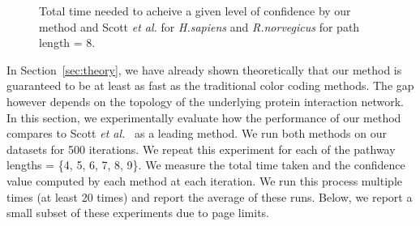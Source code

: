 \documentclass{ws-procs11x85}
\newcommand{\goodgap}{
        \hspace{\subfigtopskip}
        \hspace{\subfigbottomskip}
}
\begin{document}
\begin{figure}[t]
  \centering {}
\goodgap
{}

\caption{Total time needed to acheive a given level of confidence by
  our method and Scott {\it et al.}  for {\it H.sapiens} and {\it
    R.norvegicus} for path length = 8.  }
\label{times}
\end{figure}

In Section~\ref{sec:theory}, we have already shown theoretically that
our method is guaranteed to be at least as fast as the traditional
color coding methods. The gap however depends on the topology of the
underlying protein interaction network. In this section, we
experimentally evaluate how the performance of our method compares to
Scott {\it et al.}~\cite{scott} as a leading method. We run both
methods on our datasets for 500 iterations. We repeat this experiment
for each of the pathway lengths = \{4, 5, 6, 7, 8, 9\}.  We measure
the total time taken and the confidence value computed by each method
at each iteration. We run this process multiple times (at least 20
times) and report the average of these runs. Below, we report a small
subset of these experiments due to page limits.
\end{document}
